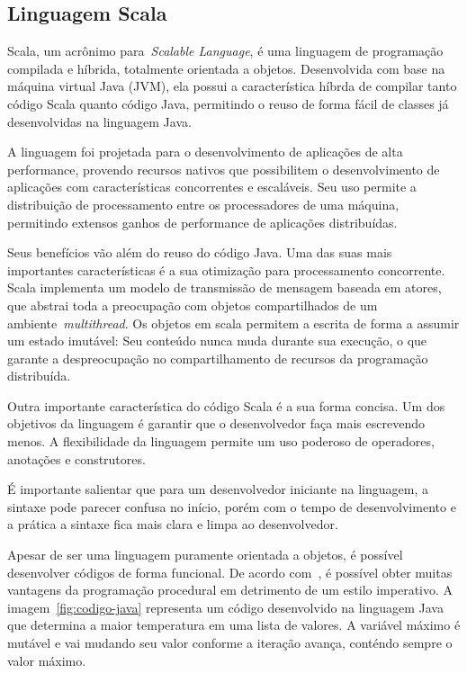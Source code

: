 \subsection{Linguagem Scala}

Scala, um acrônimo para~\emph{Scalable Language}, é uma linguagem de programação compilada e híbrida, totalmente orientada a objetos. Desenvolvida com base na máquina virtual Java (JVM), ela possui a característica híbrda de compilar tanto código Scala quanto código Java, permitindo o reuso de forma fácil de classes já desenvolvidas na linguagem Java.

A linguagem foi projetada para o desenvolvimento de aplicações de alta performance, provendo recursos nativos que possibilitem o desenvolvimento de aplicações com características concorrentes e escaláveis. Seu uso permite a distribuição de processamento entre os processadores de uma máquina, permitindo extensos ganhos de performance de aplicações distribuídas.

Seus benefícios vão além do reuso do código Java. Uma das suas mais importantes características é a sua otimização para processamento concorrente. Scala implementa um modelo de transmissão de mensagem baseada em atores, que abstrai toda a preocupação com objetos compartilhados de um ambiente~\emph{multithread}. Os objetos em scala permitem a escrita de forma a assumir um estado imutável: Seu conteúdo nunca muda durante sua execução, o que garante a despreocupação no compartilhamento de recursos da programação distribuída.

Outra importante característica do código Scala é a sua forma concisa. Um dos objetivos da linguagem é garantir que o desenvolvedor faça mais escrevendo menos. A flexibilidade da linguagem permite um uso poderoso de operadores, anotações e construtores. 

É importante salientar que para um desenvolvedor iniciante na linguagem, a sintaxe pode parecer confusa no início, porém com o tempo de desenvolvimento e a prática a sintaxe fica mais clara e limpa ao desenvolvedor.

Apesar de ser uma linguagem puramente orientada a objetos, é possível desenvolver códigos de forma funcional. De acordo com~\cite{venkat09}, é possível obter muitas vantagens da programação procedural em detrimento de um estilo imperativo. A imagem~\ref{fig:codigo-java} representa um código desenvolvido na linguagem Java que determina a maior temperatura em uma lista de valores. A variável máximo é mutável e vai mudando seu valor conforme a iteração avança, conténdo sempre o valor máximo.

